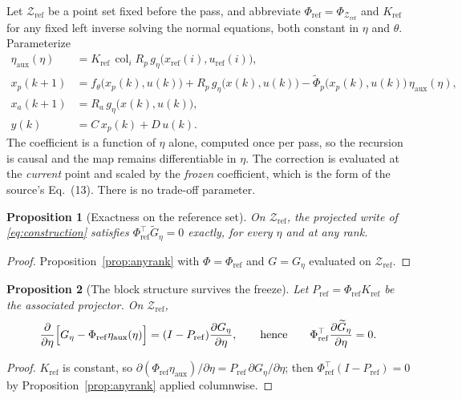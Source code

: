 \documentclass[11pt,a4paper]{article}
\newcommand{\col}{\operatorname{col}}
\newtheorem{proposition}{Proposition}[section]
\theoremstyle{remark}
\begin{document}
Let $\mathcal Z_{\mathrm{ref}}$ be a point set fixed before the pass, and abbreviate
$\Phi_{\mathrm{ref}}=\Phi_{\mathcal Z_{\mathrm{ref}}}$ and
$K_{\mathrm{ref}}$ for any fixed left inverse solving the normal equations, both constant in
$\eta$ and $\theta$. Parameterize
\begin{equation}\label{eq:construction}
\boxed{
\begin{aligned}
 \eta_{\mathrm{aux}}(\eta)&=K_{\mathrm{ref}}\,
   \col_i R_p\,g_\eta\bigl(x_{\mathrm{ref}}(i),u_{\mathrm{ref}}(i)\bigr),\\
 x_p(k+1)&=f_\theta\bigl(x_p(k),u(k)\bigr)+R_p\,g_\eta\bigl(x(k),u(k)\bigr)
           -\widetilde\Phi_p\bigl(x_p(k),u(k)\bigr)\,\eta_{\mathrm{aux}}(\eta),\\
 x_a(k+1)&=R_a\,g_\eta\bigl(x(k),u(k)\bigr),\\
 y(k)&=C\,x_p(k)+D\,u(k).
\end{aligned}}
\end{equation}
The coefficient is a function of $\eta$ alone, computed once per pass, so the recursion is causal
and the map remains differentiable in $\eta$. The correction is evaluated at the \emph{current}
point and scaled by the \emph{frozen} coefficient, which is the form of the source's Eq.~(13).
There is no trade-off parameter.

\begin{proposition}[Exactness on the reference set]\label{prop:exact}
On $\mathcal Z_{\mathrm{ref}}$, the projected write of \eqref{eq:construction} satisfies
$\Phi_{\mathrm{ref}}^\top\widetilde G_\eta=0$ exactly, for every $\eta$ and at any rank.
\end{proposition}
\begin{proof}
Proposition~\ref{prop:anyrank} with $\Phi=\Phi_{\mathrm{ref}}$ and $G=G_\eta$ evaluated on
$\mathcal Z_{\mathrm{ref}}$.
\end{proof}

\begin{proposition}[The block structure survives the freeze]\label{prop:block}
Let $P_{\mathrm{ref}}=\Phi_{\mathrm{ref}}K_{\mathrm{ref}}$ be the associated projector. On
$\mathcal Z_{\mathrm{ref}}$,
\begin{equation}
 \frac{\partial}{\partial\eta}\Bigl[G_\eta-\Phi_{\mathrm{ref}}\eta_{\mathrm{aux}}(\eta)\Bigr]
 =(I-P_{\mathrm{ref}})\frac{\partial G_\eta}{\partial\eta},
 \qquad\text{hence}\qquad
 \Phi_{\mathrm{ref}}^\top\frac{\partial\widetilde G_\eta}{\partial\eta}=0 .
\end{equation}
\end{proposition}
\begin{proof}
$K_{\mathrm{ref}}$ is constant, so
$\partial(\Phi_{\mathrm{ref}}\eta_{\mathrm{aux}})/\partial\eta
=P_{\mathrm{ref}}\,\partial G_\eta/\partial\eta$; then
$\Phi_{\mathrm{ref}}^\top(I-P_{\mathrm{ref}})=0$ by Proposition~\ref{prop:anyrank} applied
columnwise.
\end{proof}
\end{document}
